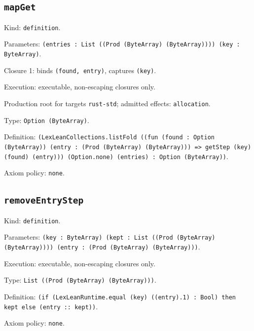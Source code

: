 \documentclass[11pt]{article}
\begin{document}
\subsection*{\texttt{mapGet}}
\noindent Kind: \texttt{definition}.\par
\noindent Parameters: \texttt{(entries : List ((Prod (ByteArray) (ByteArray)))) (key : ByteArray)}.\par
\noindent Closure 1: binds \texttt{(found, entry)}, captures \texttt{(key)}.\par
\noindent Execution: executable, non-escaping closures only.\par
\noindent Production root for targets \texttt{rust-std}; admitted effects: \texttt{allocation}.\par
\noindent Type: \texttt{Option (ByteArray)}.\par
\noindent Definition: \texttt{(LexLeanCollections.listFold ((fun (found : Option (ByteArray)) (entry : (Prod (ByteArray) (ByteArray))) => getStep (key) (found) (entry))) (Option.none) (entries) : Option (ByteArray))}.\par
\noindent Axiom policy: \texttt{none}.\par
\subsection*{\texttt{removeEntryStep}}
\noindent Kind: \texttt{definition}.\par
\noindent Parameters: \texttt{(key : ByteArray) (kept : List ((Prod (ByteArray) (ByteArray)))) (entry : (Prod (ByteArray) (ByteArray)))}.\par
\noindent Execution: executable, non-escaping closures only.\par
\noindent Type: \texttt{List ((Prod (ByteArray) (ByteArray)))}.\par
\noindent Definition: \texttt{(if (LexLeanRuntime.equal (key) ((entry).1) : Bool) then kept else (entry :: kept))}.\par
\noindent Axiom policy: \texttt{none}.\par
\end{document}
